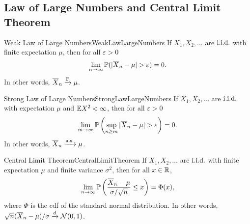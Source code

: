 \subsection{Law of Large Numbers and Central Limit Theorem}

\begin{thm}{Weak Law of Large Numbers}{WeakLawLargeNumbers}
	If $X_1, X_2, \dots$ are $\text{i.i.d.}$ with finite expectation $\mu$, then for all $\varepsilon > 0$
	\begin{equation*}
		\lim_{n \to \infty} \mathbb{P}(|\overline{X}_n - \mu| > \varepsilon) = 0.
	\end{equation*}
	In other words, $\overline{X}_n \xrightarrow{\mathbb{P}} \mu$.
\end{thm}

\begin{thm}{Strong Law of Large Numbers}{StrongLawLargeNumbers}
	If $X_1, X_2, \dots$ are $\text{i.i.d.}$ with expectation $\mu$ and $\mathbb{E} X^2 < \infty$, then for all $\varepsilon > 0$
	\begin{equation*}
		\lim_{m \to \infty} \mathbb{P} \left( \sup_{n \ge m} |\overline{X}_n - \mu| > \varepsilon \right) = 0.
	\end{equation*}
	In other words, $\overline{X}_n \xrightarrow{\text{a.s.}} \mu$.
\end{thm}

\begin{thm}{Central Limit Theorem}{CentralLimitTheorem}
	If $X_1, X_2, \dots$ are $\text{i.i.d.}$ with finite expectation $\mu$ and finite variance $\sigma^2$, then for all $x \in \mathbb{R}$,
	\begin{equation*}
		\lim_{n \to \infty} \mathbb{P} \left( \frac{\overline{X}_n - \mu}{\sigma/\sqrt{n}} \le x \right) = \Phi(x),
	\end{equation*}
	where $\Phi$ is the cdf of the standard normal distribution. In other words, $\sqrt{n}(\overline{X}_n - \mu)/\sigma \xrightarrow{d} \mathcal{N}(0, 1)$.
\end{thm}
